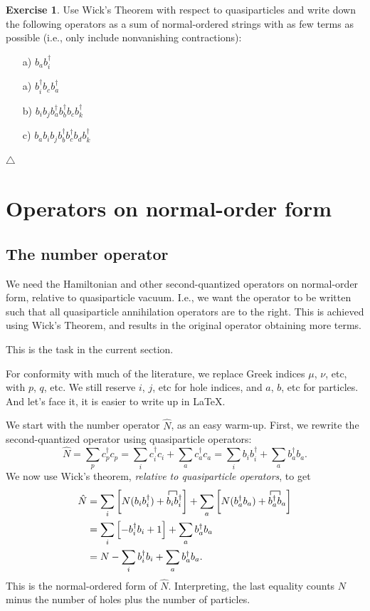 \documentclass{report}
\theoremstyle{plain}
\theoremstyle{definition}
\newtheorem{exerc}{Exercise}[chapter]
\newcommand\xqed[1]{%
  \leavevmode\unskip\penalty9999 \hbox{}\nobreak\hfill
  \quad\hbox{#1}}
\newcommand\demo{\xqed{$\triangle$}}
\newenvironment{exercise}{\bigskip\begin{exerc}}{\demo\end{exerc}\bigskip}
\begin{document}
\begin{exercise}
  Use Wick's Theorem with respect to quasiparticles and write down the
  following operators as a sum of normal-ordered strings with as few
  terms as possible (i.e., only include nonvanishing contractions):
  \begin{enumerate}
  \item[a)] $b_a b^\dag_i$
  \item[a)] $b^\dag_i b_c b^\dag_a$
  \item[b)] $b_i b_j b^\dag_a b^\dag_b b_c b^\dag_k$
  \item[c)] $b_a b_i b_j b^\dag_b b^\dag_c b_d b^\dag_k$
  \end{enumerate}
\end{exercise}

\section{Operators on normal-order form}

\subsection{The number operator}

We need the Hamiltonian and other second-quantized operators on
normal-order form, relative to quasiparticle vacuum. I.e., we want the
operator to be written such that all quasiparticle annihilation
operators are to the right. This is achieved using Wick's Theorem, and
results in the original operator obtaining more terms.

This is the task in the current section.

For conformity with much of the literature, we replace Greek indices
$\mu$, $\nu$, etc, with $p$, $q$, etc. We still reserve $i$, $j$, etc
for hole indices, and $a$, $b$, etc for particles. And let's face it,
it is easier to write up in \LaTeX.

We start with the number operator $\hat{N}$, as an easy
warm-up. First, we rewrite the second-quantized operator using
quasiparticle operators:
\begin{equation}
  \hat{N} = \sum_p c^\dag_p c_p = \sum_i c^\dag_i c_i + \sum_a
  c^\dag_a c_a = \sum_i b_i b^\dag_i + \sum_a b^\dag_a b_a .
\end{equation}
We now use Wick's theorem, \emph{relative to quasiparticle
  operators}, to get
\begin{equation}
  \begin{split}
    \hat{N} &= \sum_i \left[ N(b_i b^\dag_i) +
      \contraction{}{b}{{}_i }{b} b_i b^\dag_i \right] + \sum_a \left[ N(b^\dag_a b_a) +
      \contraction{}{b}{{}^\dag_a }{b} b^\dag_a b_a \right] \\
    &= \sum_i \left[ -b^\dag_i b_i + 1 \right] + \sum_a b^\dag_a b_a
    \\
    &= N - \sum_i b^\dag_i b_i + \sum_a b^\dag_a b_a.
  \end{split}
\end{equation}
This is the normal-ordered form of $\hat{N}$. Interpreting, the last
equality counts $N$ minus the number of holes plus the number of
particles.
\end{document}
